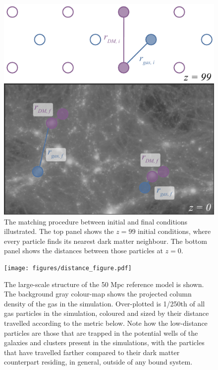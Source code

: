 \begin{figure}
    \centering
    \includegraphics[width=\columnwidth]{figures/kspafig_small.pdf}
    \vspace{-0.5cm}
    \caption{The matching procedure between initial and final conditions
    illustrated. The top panel shows the $z=99$ initial conditions, where
    every particle finds its nearest dark matter neighbour. The bottom
    panel shows the distances between those particles at $z=0$.}
    \vspace{-0.5cm}
    \label{fig:kspafigsmall}
\end{figure}

\begin{figure}
    \centering
    \texttt{[image: figures/distance\_figure.pdf]}
    \caption{The large-scale structure of the 50 Mpc reference model is shown.
    The background gray colour-map shows the projected column density of the
    gas in the simulation. Over-plotted is 1/250th of all gas particles
    in the simulation, coloured and sized by their distance travelled
    according to the metric below. Note how the low-distance particles
    are those that are trapped in the potential wells of the galaxies
    and clusters present in the simulations, with the particles that
    have travelled farther compared to their dark matter counterpart
    residing, in general, outside of any bound system.}
    \label{fig:feedbackpic}
\end{figure}

